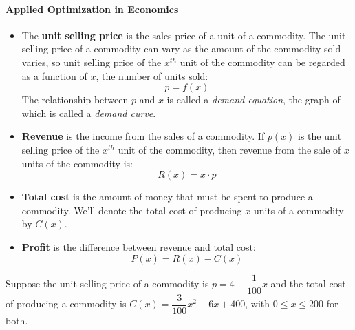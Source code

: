 \documentclass[10pt]{article}
\begin{document}
\paragraph*{Applied Optimization in Economics}
\begin{itemize}
\item The {\bf unit selling price} is the sales price of a unit of a commodity. The unit selling price of a commodity can vary as the amount of the commodity sold varies, so unit selling price of the $x^{th}$ unit of the commodity can be regarded as a function of $x$, the number of units sold: 
\[p=f(x)\] 
The relationship between $p$ and $x$ is called a {\it demand equation}, the graph of which is called a {\it demand curve}.
\item {\bf Revenue} is the income from the sales of a commodity. If $p(x)$ is the unit selling price of the $x^{th}$ unit of the commodity, then revenue from the sale of $x$ units of the commodity is: \[R(x)=x\cdot p\]
\item {\bf Total cost} is the amount of money that must be spent to produce a commodity. We'll denote the total cost of producing $x$ units of a commodity by $C(x)$.
\item {\bf Profit} is the difference between revenue and total cost:
\[P(x) = R(x) - C(x)\]
\end{itemize}
%
{\exercise} Suppose the unit selling price of a commodity is $p=4-\dfrac1{100}x$ and the total cost of producing a commodity is $C(x)=\dfrac{3}{100}x^2-6x+400$, with $0\leq x\leq 200$ for both.\\
\end{document}
